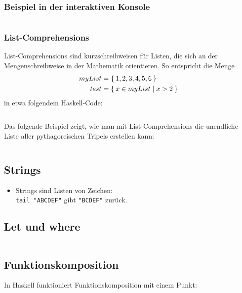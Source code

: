\subsubsection{Beispiel in der interaktiven Konsole}
\inputminted[numbersep=5pt, tabsize=4]{haskell}{scripts/haskell/listenoperationen.sh}

\subsubsection{List-Comprehensions}%
List-Comprehensions sind kurzschreibweisen für Listen, die sich an 
der Mengenschreibweise in der Mathematik orientieren. So entspricht
die Menge
\begin{align*}
    myList &= \Set{1,2,3,4,5,6}\\
    test   &= \Set{x \in myList | x > 2}
\end{align*}
in etwa folgendem Haskell-Code:
\inputminted[numbersep=5pt, tabsize=4]{haskell}{scripts/haskell/list-comprehensions.sh}

\begin{beispiel}
    Das folgende Beispiel zeigt, wie man mit List-Comprehensions die unendliche
    Liste aller pythagoreischen Tripels erstellen kann:

    \inputminted[numbersep=5pt, tabsize=4]{haskell}{scripts/haskell/pythagorean-triples.hs}
\end{beispiel}

\subsection{Strings}
\begin{itemize}
    \item Strings sind Listen von Zeichen:\\
          \texttt{tail "ABCDEF"} gibt \texttt{"BCDEF"} zurück.
\end{itemize}

\subsection{Let und where}%
\inputminted[numbersep=5pt, tabsize=4]{haskell}{scripts/haskell/let-where-bindung.hs}

\subsection{Funktionskomposition}%
In Haskell funktioniert Funktionskomposition mit einem Punkt:

